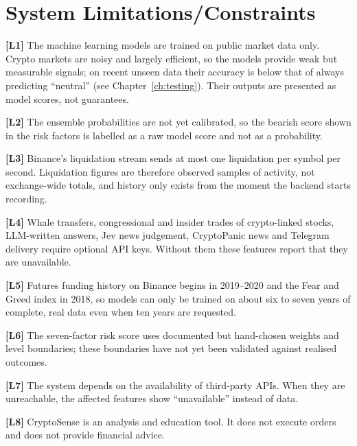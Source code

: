 \section{System Limitations/Constraints}
\textbf{[L1]} The machine learning models are trained on public market data only. Crypto markets are noisy and largely efficient, so the models provide weak but measurable signals; on recent unseen data their accuracy is below that of always predicting ``neutral'' (see Chapter~\ref{ch:testing}). Their outputs are presented as model scores, not guarantees.

\textbf{[L2]} The ensemble probabilities are not yet calibrated, so the bearish score shown in the risk factors is labelled as a raw model score and not as a probability.

\textbf{[L3]} Binance's liquidation stream sends at most one liquidation per symbol per second. Liquidation figures are therefore observed samples of activity, not exchange-wide totals, and history only exists from the moment the backend starts recording.

\textbf{[L4]} Whale transfers, congressional and insider trades of crypto-linked stocks, LLM-written answers, Jev news judgement, CryptoPanic news and Telegram delivery require optional API keys. Without them these features report that they are unavailable.

\textbf{[L5]} Futures funding history on Binance begins in 2019--2020 and the Fear and Greed index in 2018, so models can only be trained on about six to seven years of complete, real data even when ten years are requested.

\textbf{[L6]} The seven-factor risk score uses documented but hand-chosen weights and level boundaries; these boundaries have not yet been validated against realised outcomes.

\textbf{[L7]} The system depends on the availability of third-party APIs. When they are unreachable, the affected features show ``unavailable'' instead of data.

\textbf{[L8]} CryptoSense is an analysis and education tool. It does not execute orders and does not provide financial advice.

